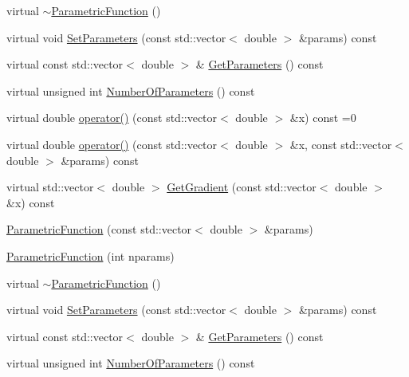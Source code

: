 \begin{DoxyCompactItemize}
virtual \mbox{\hyperlink{classROOT_1_1Minuit2_1_1ParametricFunction_a18aae731e634b4fc1c79403d8f49caa9}{$\sim$\+Parametric\+Function}} ()
\item 
virtual void \mbox{\hyperlink{classROOT_1_1Minuit2_1_1ParametricFunction_a63417244db376ec27f2c85ee6432f552}{Set\+Parameters}} (const std\+::vector$<$ double $>$ \&params) const
\item 
virtual const std\+::vector$<$ double $>$ \& \mbox{\hyperlink{classROOT_1_1Minuit2_1_1ParametricFunction_ac3e70b4d9b0cbe60c529823f6a612a5e}{Get\+Parameters}} () const
\item 
virtual unsigned int \mbox{\hyperlink{classROOT_1_1Minuit2_1_1ParametricFunction_a8e5e21de5e8f6e5bedd1ae7ea27b24ac}{Number\+Of\+Parameters}} () const
\item 
virtual double \mbox{\hyperlink{classROOT_1_1Minuit2_1_1ParametricFunction_a953426fa51c84cdef3eba24274131806}{operator()}} (const std\+::vector$<$ double $>$ \&x) const =0
\item 
virtual double \mbox{\hyperlink{classROOT_1_1Minuit2_1_1ParametricFunction_a5fab6e804e0f93bd593580f582b0f7c5}{operator()}} (const std\+::vector$<$ double $>$ \&x, const std\+::vector$<$ double $>$ \&params) const
\item 
virtual std\+::vector$<$ double $>$ \mbox{\hyperlink{classROOT_1_1Minuit2_1_1ParametricFunction_a209b13474fae14c1e4a5523c6850c7ed}{Get\+Gradient}} (const std\+::vector$<$ double $>$ \&x) const
\item 
\mbox{\hyperlink{classROOT_1_1Minuit2_1_1ParametricFunction_a5abce16504b1532a38da1409afdaa71d}{Parametric\+Function}} (const std\+::vector$<$ double $>$ \&params)
\item 
\mbox{\hyperlink{classROOT_1_1Minuit2_1_1ParametricFunction_a0b8e823b3a61fc0f20ffe419e0fa1e1a}{Parametric\+Function}} (int nparams)
\item 
virtual \mbox{\hyperlink{classROOT_1_1Minuit2_1_1ParametricFunction_a18aae731e634b4fc1c79403d8f49caa9}{$\sim$\+Parametric\+Function}} ()
\item 
virtual void \mbox{\hyperlink{classROOT_1_1Minuit2_1_1ParametricFunction_a63417244db376ec27f2c85ee6432f552}{Set\+Parameters}} (const std\+::vector$<$ double $>$ \&params) const
\item 
virtual const std\+::vector$<$ double $>$ \& \mbox{\hyperlink{classROOT_1_1Minuit2_1_1ParametricFunction_ac3e70b4d9b0cbe60c529823f6a612a5e}{Get\+Parameters}} () const
\item 
virtual unsigned int \mbox{\hyperlink{classROOT_1_1Minuit2_1_1ParametricFunction_a8e5e21de5e8f6e5bedd1ae7ea27b24ac}{Number\+Of\+Parameters}} () const

\end{DoxyCompactItemize}
